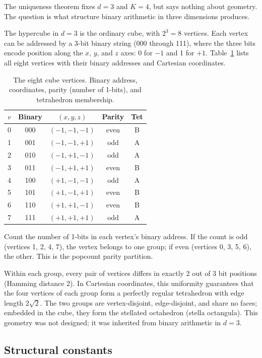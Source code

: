 \documentclass[twocolumn]{iopjournal}
\begin{document}
The uniqueness theorem fixes $d = 3$ and $K = 4$, but says nothing about geometry. The question is what structure binary arithmetic in three dimensions produces.

The hypercube in $d = 3$ is the ordinary cube, with $2^3 = 8$ vertices. Each vertex can be addressed by a 3-bit binary string (000 through 111), where the three bits encode position along the $x$, $y$, and $z$ axes: 0 for $-1$ and 1 for $+1$. Table~\ref{tab:vertices} lists all eight vertices with their binary addresses and Cartesian coordinates.

\begin{table}[h]
\centering
\caption{The eight cube vertices. Binary address, coordinates, parity (number of 1-bits), and tetrahedron membership.}
\label{tab:vertices}
\begin{tabular}{ccccc}
\hline
$v$ & Binary & $(x,y,z)$ & Parity & Tet \\
\hline
0 & 000 & $(-1,-1,-1)$ & even & B \\
1 & 001 & $(-1,-1,+1)$ & odd & A \\
2 & 010 & $(-1,+1,-1)$ & odd & A \\
3 & 011 & $(-1,+1,+1)$ & even & B \\
4 & 100 & $(+1,-1,-1)$ & odd & A \\
5 & 101 & $(+1,-1,+1)$ & even & B \\
6 & 110 & $(+1,+1,-1)$ & even & B \\
7 & 111 & $(+1,+1,+1)$ & odd & A \\
\hline
\end{tabular}
\end{table}

Count the number of 1-bits in each vertex's binary address. If the count is odd (vertices 1, 2, 4, 7), the vertex belongs to one group; if even (vertices 0, 3, 5, 6), the other. This is the popcount parity partition.

Within each group, every pair of vertices differs in exactly 2 out of 3 bit positions (Hamming distance 2). In Cartesian coordinates, this uniformity guarantees that the four vertices of each group form a perfectly regular tetrahedron with edge length $2\sqrt{2}$. The two groups are vertex-disjoint, edge-disjoint, and share no faces; embedded in the cube, they form the stellated octahedron (stella octangula). This geometry was not designed; it was inherited from binary arithmetic in $d = 3$.

\subsection{Structural constants}
\end{document}
